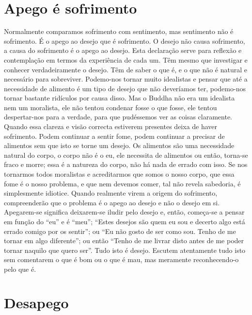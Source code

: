 \section{Apego é sofrimento}

Normalmente comparamos sofrimento com sentimento,
mas sentimento não é sofrimento. É o apego ao desejo que
é sofrimento. O desejo não causa sofrimento, a causa do sofrimento é o apego ao desejo. Esta declaração serve para reflexão
e contemplação em termos da experiência de cada um.
Têm mesmo que investigar e conhecer verdadeiramente
o desejo. Têm de saber o que é, e o que não é natural e
necessário para sobreviver. Podemo-nos tornar muito idealistas e pensar que até a necessidade de alimento é um tipo de
desejo que não deveríamos ter, podemo-nos tornar bastante
ridículos por causa disso. Mas o Buddha não era um idealista
nem um moralista, ele não tentou condenar fosse o que fosse,
ele tentou despertar-nos para a verdade, para que pudéssemos
ver as coisas claramente.
Quando essa clareza e visão correcta estiverem presentes
deixa de haver sofrimento. Podem continuar a sentir fome,
podem continuar a precisar de alimentos sem que isto se torne
um desejo. Os alimentos são uma necessidade natural do
corpo, o corpo não é o eu, ele necessita de alimentos ou então,
torna-se fraco e morre; essa é a natureza do corpo, não há
nada de errado com isso. Se nos tornarmos todos moralistas
e acreditarmos que somos o nosso corpo, que essa fome é o
nosso problema, e que nem devemos comer, tal não revela
sabedoria, é simplesmente idiotice.
Quando realmente virem a origem do sofrimento, compreenderão que o problema é o apego ao desejo e não o desejo
em si. Apegarem-se significa deixarem-se iludir pelo desejo e,
então, começa-se a pensar em função do “eu” e é “meu”; “Estes
desejos são quem eu sou e decerto algo está errado comigo por
os sentir”; ou “Eu não gosto de ser como sou. Tenho de me
tornar em algo diferente”; ou então “Tenho de me livrar disto
antes de me poder tornar naquilo que quero ser”. Tudo isto é
desejo. Escutem atentamente tudo isto sem comentarem o que
é bom ou o que é mau, mas meramente reconhecendo-o pelo
que é.

\section{Desapego}

